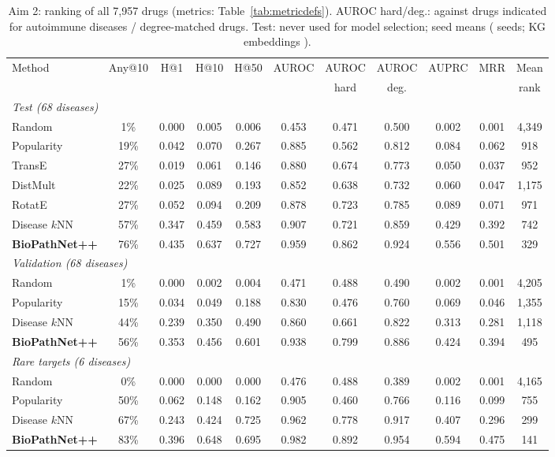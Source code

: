 \documentclass{svproc}
\newcommand{\sysname}{BioPathNet++\xspace}
\begin{document}
\begin{table}[!htbp]
\centering
\caption{Aim 2: ranking of all 7,957 drugs (metrics: Table~\ref{tab:metricdefs}). AUROC hard/deg.: against drugs indicated for autoimmune diseases / degree-matched drugs. Test: never used for model selection; seed means (\TestSeeds{} seeds; KG embeddings \KgeRotateSeeds).}
\label{tab:main}
\scriptsize
\setlength{\tabcolsep}{3pt}
\setlength{\tabcolsep}{2pt}
\begin{tabular}{lcccccccccc}
\toprule
Method & Any@10 & H@1 & H@10 & H@50 & AUROC & AUROC & AUROC & AUPRC & MRR & Mean\\
 & & & & & & hard & deg. & & & rank\\
\midrule
\multicolumn{11}{l}{\textit{Test (68 diseases)}}\\
Random & 1\% & 0.000 & 0.005 & 0.006 & 0.453 & 0.471 & 0.500 & 0.002 & 0.001 & 4,349\\
Popularity & 19\% & 0.042 & 0.070 & 0.267 & 0.885 & 0.562 & 0.812 & 0.084 & 0.062 & 918\\
TransE & 27\% & 0.019 & 0.061 & 0.146 & 0.880 & 0.674 & 0.773 & 0.050 & 0.037 & 952\\
DistMult & 22\% & 0.025 & 0.089 & 0.193 & 0.852 & 0.638 & 0.732 & 0.060 & 0.047 & 1,175\\
RotatE & 27\% & 0.052 & 0.094 & 0.209 & 0.878 & 0.723 & 0.785 & 0.089 & 0.071 & 971\\
Disease $k$NN & 57\% & 0.347 & 0.459 & 0.583 & 0.907 & 0.721 & 0.859 & 0.429 & 0.392 & 742\\
\textbf{\sysname} & 76\% & 0.435 & 0.637 & 0.727 & 0.959 & 0.862 & 0.924 & 0.556 & 0.501 & 329\\
\midrule
\multicolumn{11}{l}{\textit{Validation (68 diseases)}}\\
Random & 1\% & 0.000 & 0.002 & 0.004 & 0.471 & 0.488 & 0.490 & 0.002 & 0.001 & 4,205\\
Popularity & 15\% & 0.034 & 0.049 & 0.188 & 0.830 & 0.476 & 0.760 & 0.069 & 0.046 & 1,355\\
Disease $k$NN & 44\% & 0.239 & 0.350 & 0.490 & 0.860 & 0.661 & 0.822 & 0.313 & 0.281 & 1,118\\
\textbf{\sysname} & 56\% & 0.353 & 0.456 & 0.601 & 0.938 & 0.799 & 0.886 & 0.424 & 0.394 & 495\\
\midrule
\multicolumn{11}{l}{\textit{Rare targets (6 diseases)}}\\
Random & 0\% & 0.000 & 0.000 & 0.000 & 0.476 & 0.488 & 0.389 & 0.002 & 0.001 & 4,165\\
Popularity & 50\% & 0.062 & 0.148 & 0.162 & 0.905 & 0.460 & 0.766 & 0.116 & 0.099 & 755\\
Disease $k$NN & 67\% & 0.243 & 0.424 & 0.725 & 0.962 & 0.778 & 0.917 & 0.407 & 0.296 & 299\\
\textbf{\sysname} & 83\% & 0.396 & 0.648 & 0.695 & 0.982 & 0.892 & 0.954 & 0.594 & 0.475 & 141\\
\bottomrule
\end{tabular}
\end{table}
\end{document}
